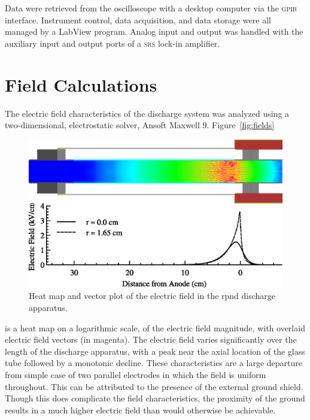 Data were retrieved from the oscilloscope with a desktop computer via the
\textsc{gpib} interface. Instrument control, data acquisition, and data storage
were all managed by a LabView program. Analog input and output was handled with
the auxiliary input and output ports of a \textsc{srs} 
lock-in amplifier.

\section{Field Calculations}

The electric field characteristics of the discharge system was analyzed using a
two-dimensional, electrostatic solver, Ansoft Maxwell 9. Figure~\ref{fig:fields}
\begin{figure}
  \centering
  \includegraphics{./chapters/experiment/figures/cfields.eps}
  \caption{Heat map and vector plot of the electric field in the \acs{rpnd}
  discharge apparatus.}
  \label{fig:cfields}
\end{figure}
is a heat map on a logarithmic scale, of the electric field magnitude, with
overlaid electric field vectors (in magenta). The electric field varies
significantly over the length of the discharge apparatus, with a peak near the
axial location of the glass tube followed by a monotonic decline. These
characteristics are a large departure from simple case of two parallel
electrodes in which the field is uniform throughout. This can be attributed to
the presence of the external ground shield. Though this does complicate the
field characteristics, the proximity of the ground results in a much higher
electric field than would otherwise be achievable.

